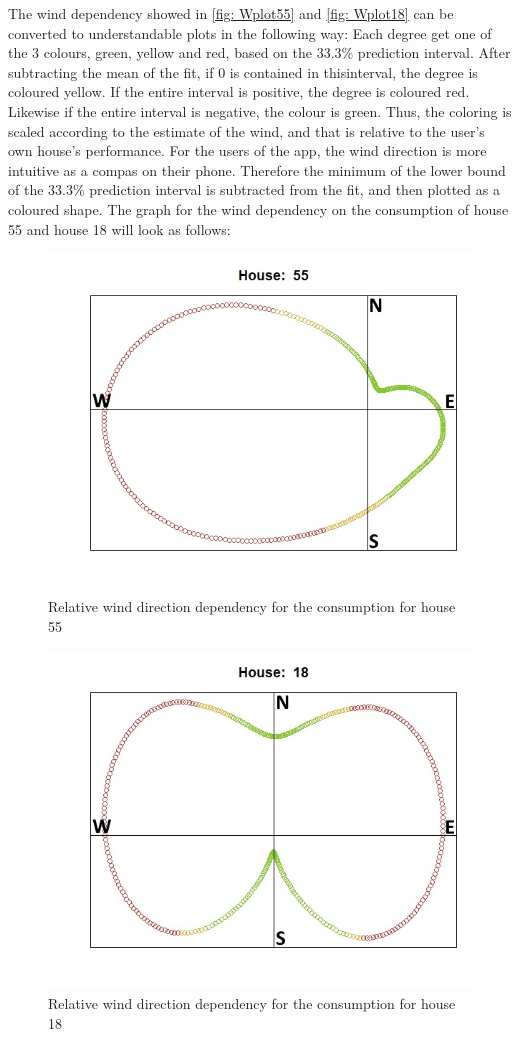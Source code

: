 \noindent The wind dependency showed in \cref{fig: Wplot55} and \cref{fig: Wplot18} can be converted to understandable plots in the following way: Each degree get one of the 3 colours, green, yellow and red, based on the 33.3\% prediction interval.  After subtracting the mean of the fit, if 0 is contained in thisinterval, the degree is coloured yellow.  If the entire interval is positive, the degree is coloured red.  Likewise if the entire interval is negative, the colour is green. Thus, the coloring is scaled according to the estimate of the wind, and that is relative to the user's own house's performance. For the users of the app, the wind direction is more intuitive as a compas on their phone.  Therefore the minimum of the lower bound of the 33.3\% prediction interval is subtracted from the fit, and then plotted as a coloured shape. The graph for the wind dependency on the consumption of house 55 and house 18 will look as follows:
\begin{figure}
    \centering
    \includegraphics[width=.8\textwidth]{../../../figures/WKplot55.jpeg}
    \caption{Relative wind direction dependency for the consumption for house 55}
    \label{fig: WKplot55}
\end{figure}
\begin{figure}
    \centering
    \includegraphics[width=.8\textwidth]{../../../figures/WKplot18.jpeg}
    \caption{Relative wind direction dependency for the consumption for house 18}
    \label{fig: WKplot18}
\end{figure}
